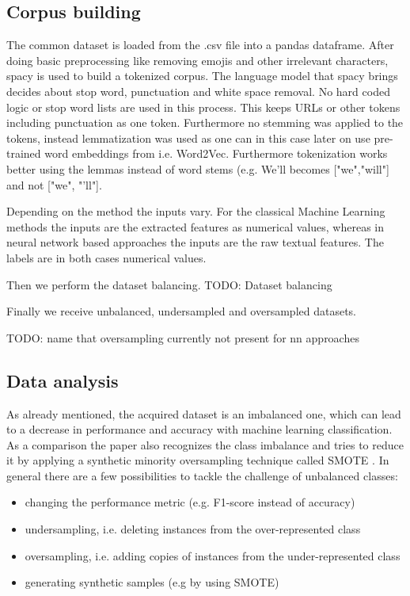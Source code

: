\subsection{Corpus building}

The common dataset is loaded from the .csv file into a pandas dataframe. After doing basic preprocessing like removing emojis and other irrelevant characters, spacy is used to build a tokenized corpus. The language model that spacy brings decides about stop word, punctuation and white space removal. No hard coded logic or stop word lists are used in this process. This keeps URLs or other tokens including punctuation as one token. Furthermore no stemming was applied to the tokens, instead lemmatization was used as one can in this case later on use pre-trained word embeddings from i.e. Word2Vec. Furthermore tokenization works better using the lemmas instead of word stems (e.g. We'll becomes ["we","will"] and not ["we", "'ll"].



Depending on the method the inputs vary. For the classical Machine Learning methods the inputs are the extracted features as numerical values, whereas in neural network based approaches the inputs are the raw textual features. The labels are in both cases numerical values.

Then we perform the dataset balancing.
TODO: Dataset balancing


Finally we receive unbalanced, undersampled and oversampled datasets.

TODO: name that oversampling currently not present for nn approaches

\subsection{Data analysis} \label{sec:data_analysis}


As already mentioned, the acquired dataset is an imbalanced one, which can lead to a decrease in performance and accuracy with machine learning classification. As a comparison the paper \cite{Oriola2020} also recognizes the class imbalance and tries to reduce it by applying a synthetic minority oversampling technique called SMOTE \cite{Chawla2011}. In general there are a few possibilities to tackle the challenge of unbalanced classes:

\begin{itemize}
    \item changing the performance metric (e.g. F1-score instead of accuracy)
    \item undersampling, i.e. deleting instances from the over-represented class
    \item oversampling, i.e. adding copies of instances from the under-represented class
    \item generating synthetic samples (e.g by using SMOTE)
\end{itemize}


